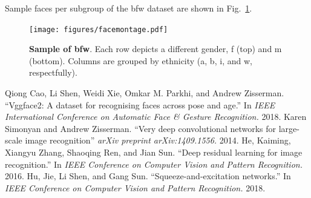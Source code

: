 Sample faces per subgroup of the \gls{bfw} dataset are shown in Fig.~\ref{fig:montage:app}.
\begin{figure}[h!]
\vspace{-2mm}
    \centering
    \texttt{[image: figures/facemontage.pdf]}
    \caption{\textbf{Sample of \gls{bfw}}. Each row depicts a different gender, \gls{f} (top) and \gls{m} (bottom). Columns are grouped by ethnicity (\ie \gls{a}, \gls{b}, \gls{i}, and \gls{w}, respectfully).}
    \label{fig:montage:app}
    \vspace{-1mm}
\end{figure}
{
\scriptsize
\begin{thebibliography}{widest entry}
  Qiong Cao, Li Shen, Weidi Xie, Omkar M. Parkhi, and Andrew Zisserman. ``Vggface2: A dataset for recognising faces across pose and age.'' In \textit{IEEE International Conference on Automatic Face \& Gesture Recognition.} 2018.
  Karen Simonyan and Andrew Zisserman. ``Very deep convolutional networks for large-scale image recognition'' \textit{arXiv preprint arXiv:1409.1556.} 2014.
   He, Kaiming, Xiangyu Zhang, Shaoqing Ren, and Jian Sun. ``Deep residual learning for image recognition.'' In \textit{IEEE Conference on Computer Vision and Pattern Recognition.} 2016.
  Hu, Jie, Li Shen, and Gang Sun. ``Squeeze-and-excitation networks.'' In \textit{IEEE Conference on Computer Vision and Pattern Recognition.} 2018.
\end{thebibliography}
}

